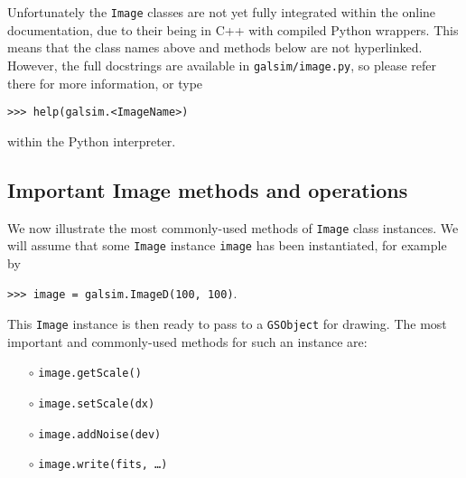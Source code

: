 \documentclass[preprint,11pt]{aastex}
\begin{document}
Unfortunately the \texttt{Image} classes are not yet fully integrated
within the online documentation, due to their being in C++ with
compiled Python wrappers.  This means that the class names above and
methods below are not hyperlinked.  However, the full docstrings are
available in \texttt{galsim/image.py}, so please refer there for more
information, or type

{\tt >>> help(galsim.<ImageName>)}

within the Python interpreter.

\subsection{Important Image methods and operations}\label{sect:imagemethods}
We now illustrate the most commonly-used methods of \texttt{Image}
class instances.  We will assume that some \texttt{Image} instance
\texttt{image} has been instantiated, for example by

{\tt >>> image = galsim.ImageD(100, 100)}.

This \texttt{Image} instance is then ready to pass to a
\texttt{GSObject} for drawing.  The most important and commonly-used
methods for such an instance are:
\begin{itemize}

\item[$\circ$] \texttt{image.getScale()} 

\item[$\circ$] \texttt{image.setScale(dx)} 

\item[$\circ$] \texttt{image.addNoise(dev)} 

\item[$\circ$] \texttt{image.write(fits, \dots)}  

\end{itemize}
\end{document}
